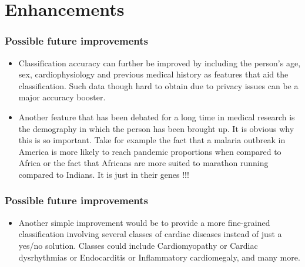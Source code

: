 \documentclass[11pt,xcolor=dvipsnames]{beamer}
\begin{document}
\section{Enhancements}	
\begin{frame}
\frametitle{Possible future improvements}
\begin{itemize}
\item Classification accuracy can further be improved by including the person's {\color{PineGreen}age, sex, cardiophysiology and previous medical history} as features that aid the classification. Such data though hard to obtain due to privacy issues can be a major accuracy booster.\\
\item Another feature that has been debated for a long time in medical research is the {\color{PineGreen}demography} in which the person has been brought up. It is obvious why this is so important. Take for example the fact that a malaria outbreak in America is more likely to reach pandemic proportions when compared to Africa or the fact that Africans are more suited to marathon running compared to Indians. It is just in their genes !!!\\
\end{itemize}
\end{frame}



\begin{frame}
\frametitle{Possible future improvements}
\begin{itemize}
\item Another simple improvement would be to provide a more fine-grained classification involving several classes of cardiac diseases instead of just a yes/no solution. Classes could include Cardiomyopathy or Cardiac dysrhythmias or Endocarditis or Inflammatory cardiomegaly, and many more.
\end{itemize}
\end{frame}
\end{document}
